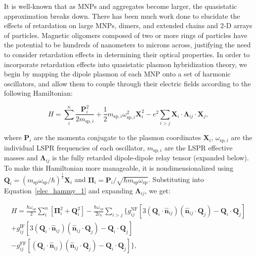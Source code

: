 \documentclass[journal=apchd5,manuscript=article]{achemso}
\begin{document}
It is well-known that as MNPs and aggregates become larger, the quasistatic approximation breaks down. There has been much work done to elucidate the effects of retardation on large MNPs\cite{Abajo2008,Gu2010}, dimers\cite{vonPlessen2007,Rechbacher2003,Kottman2001}, and extended chains and 2-D arrays of particles\cite{Schatz2003,Royer2005,Chumanov2010,Pinchuk2016}. Magnetic oligomers composed of two or more rings of particles have the potential to be hundreds of nanometers to microns across, justifying the need to consider retardation effects in determining their optical properties. In order to incorporate retardation effects into quasistatic plasmon hybridization theory, we begin by mapping the dipole plasmon of each MNP onto a set of harmonic oscillators, and allow them to couple through their electric fields according to the following Hamiltonian\cite{Cherqui2014}:

\begin{equation}
H = \sum_{i}^{n}\frac{\textbf{P}_{i}^{2}}{2m_{\textrm{sp},i}} + \frac{1}{2}m_{\textrm{sp},i}\omega_{\textrm{sp},i}^2\textbf{X}_{i}^{2} - e^2\sum_{i>j}\textbf{X}_i\cdot\boldsymbol{\Lambda}_{ij}\cdot\textbf{X}_j,\label{elec_hammy_1}
\end{equation}

where $\textbf{P}_i$ are the momenta conjugate to the plasmon coordinates $\textbf{X}_{i}$, $\omega_{\textrm{sp},i}$ are the individual LSPR frequencies of each oscillator, $m_{\textrm{sp},i}$ are the LSPR effective masses and $\boldsymbol{\Lambda}_{ij}$ is the fully retarded dipole-dipole relay tensor (expanded below)\cite{jackson_classical_1999}. To make this Hamiltonian more manageable, it is nondimensionalized using $\textbf{Q}_i = \left(m_{\textrm{sp}}\omega_{\textrm{sp}}/\hbar\right)^{\frac{1}{2}}\textbf{X}_i$ and $\boldsymbol{\Pi}_i = \textbf{P}_i/\sqrt{\hbar m_{\textrm{sp}}\omega_{\textrm{sp}}}$. Substituting into Equation~\ref{elec_hammy_1} and expanding $\boldsymbol{\Lambda}_{ij}$, we get:

\begin{equation}
\begin{aligned}
H = 
\frac{\hbar\omega_{sp}}{2}\sum_{i}^{n}[\boldsymbol{\Pi}_i^2 + \textbf{Q}_i^2] - \frac{\hbar\omega_{sp}}{2\varepsilon_b}\sum_{i>j}\{g_{ij}^{\textrm{NF}}\left[3(\textbf{Q}_i\cdot\hat{\textbf{n}}_{ij})(\hat{\textbf{n}}_{ij}\cdot\textbf{Q}_j) - \textbf{Q}_i\cdot\textbf{Q}_j\right] \\
+ g_{ij}^{\textrm{IF}}\left[3(\textbf{Q}_i\cdot\hat{\textbf{n}}_{ij})(\hat{\textbf{n}}_{ij}\cdot\textbf{Q}_j) -\textbf{Q}_i\cdot\textbf{Q}_j\right] \\ 
- g_{ij}^{\textrm{FF}}\left[(\textbf{Q}_i\cdot\hat{\textbf{n}}_{ij})(\hat{\textbf{n}}_{ij}\cdot\textbf{Q}_j) -\textbf{Q}_i\cdot\textbf{Q}_j\right]\},\label{elec_hammy_2}
\end{aligned}
\end{equation}
\end{document}
